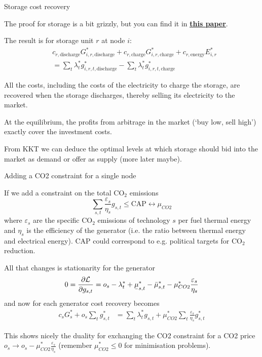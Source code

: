 \documentclass[10pt,aspectratio=169,dvipsnames]{beamer}
\def\l{\lambda}
\def\m{\mu}
\def\d{\partial}
\def\cL{\mathcal{L}}
\def\co2{CO${}_2$}
\newcommand{\ubar}[1]{\text{\b{$#1$}}}
\begin{document}
\begin{frame}{Storage cost recovery}

  The proof for storage is a bit grizzly, but you can find it in \href{https://arxiv.org/abs/2002.05209}{\bf\color{blue}\underline{this paper}}.

  The result is for storage unit $r$ at node $i$:
    \begin{align*}
      & c_{r,\textrm{discharge}} G_{i,r,\textrm{discharge}}^* +        c_{r,\textrm{charge}} G_{i,r,\textrm{charge}}^* +  c_{r,\textrm{energy}}  E^*_{i,r} \\
      & = \sum_t \lambda_t^* g_{i,r,t,\textrm{discharge}}^* - \sum_t \lambda_t^* g_{i,r,t,\textrm{charge}}^*
    \end{align*}

    All the costs, including the costs of the electricity to charge the storage, are recovered when the storage discharges, thereby selling its electricity to the market.

    At the equilibrium, the profits from arbitrage in the market (`buy low, sell high') exactly cover the investment costs.

    From KKT we can deduce the optimal levels at which storage should bid into the market as demand or offer as supply (more later maybe).


\end{frame}


\begin{frame}{Adding a CO2 constraint for a single node}

If we add a constraint on the total \co2 emissions
\begin{equation*}
  \sum_{s,t} \frac{\varepsilon_s}{\eta_{s}} g_{s,t} \leq \textrm{CAP}  \leftrightarrow \m_{CO2}
\end{equation*}
where $\varepsilon_s$ are the specific \co2 emissions of technology $s$ per fuel
thermal energy and $\eta_s$ is the efficiency of the generator
(i.e. the ratio between thermal energy and electrical energy). CAP
could correspond to e.g. political targets for \co2 reduction.

All that changes is stationarity for the generator
\begin{align*}
  0 =     \frac{\d \cL}{\d g_{s,t}} =   o_{s}-\l_t^* + \ubar{\m}^*_{s,t} - \bar{\m}^*_{s,t} - \m_{CO2}^* \frac{\varepsilon_s}{\eta_{s}}
\end{align*}
and now for each generator cost recovery becomes
\begin{align*}
  c_s G_s^* +  o_{s}\sum_{t} g_{s,t}^*
  & = \sum_{t} \l_t^* g_{s,t} +\m_{CO2}^* \sum_{t}  \frac{\varepsilon_s}{\eta_{s}} g_{s,t}^*
\end{align*}

This shows nicely the duality for exchanging the CO2 constraint for a CO2 price $o_{s} \to o_{s} - \m^*_{CO2} \frac{\varepsilon_s}{\eta_{s}} $ (remember $\m^*_{CO2} \leq 0$ for minimisation problems).

\end{frame}
\end{document}
